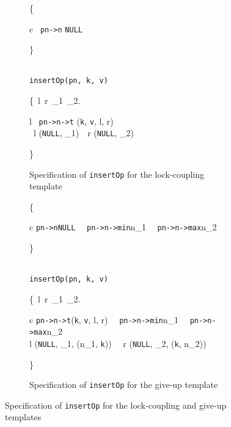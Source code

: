 \documentclass[sigplan,10pt,anonymous,review]{acmart}\settopmatter{printfolios=true,printccs=false,printacmref=false}
\begin{document}
\begin{figure*}[h]
	\begin{subfigure}{\textwidth}
		\centering
		\begin{mathpar}
			{\color{blue}
				\left\{ 
				\begin{array}{c}
					\ \texttt{pn->n} \mapsto \texttt{NULL}  
				\end{array}
				\right\}
			}
			\\ 
			\texttt{insertOp(pn, k, v)} 
			\\
			{\color{blue}
				\left\{\exists \  l\ r\ \mathit{lk}_1\ _2.
				\begin{array}{l}
					\ \texttt{pn->n->t} \mapsto (\texttt{k}, \texttt{v}, l, r) \ \ast \ \\ 
					\ l \mapsto (\texttt{NULL}, _1)\  \ast \ r \mapsto (\texttt{NULL}, \mathit{lk}_2)
				\end{array}
				\right\}
			}
		\end{mathpar}
		\caption{Specification of \texttt{insertOp} for the lock-coupling template}
		\label{fig:insertOp_lock}
	\end{subfigure}
	\begin{subfigure}{\textwidth}
		\begin{mathpar}
			{\color{blue}
				\left\{ 
				\begin{array}{c}
					\texttt{pn->n}\mapsto \texttt{NULL} \  \ast \ \texttt{pn->n->min}\mapsto n_1 \ \ast \ \texttt{pn->n->max}\mapsto n_2
				\end{array}
				\right\}
			}
			\\
			\texttt{insertOp(pn, k, v)}
			\\
			{\color{blue}
				\left\{\exists \ l\ r\ _1\ _2. 
				\begin{array}{c}
					\texttt{pn->n->t}\mapsto (\texttt{k}, \texttt{v}, l, r) \  \ast \ \texttt{pn->n->min}\mapsto n_1 \ \ast \ \texttt{pn->n->max}\mapsto n_2  \ \ast \ 
					\\ l \mapsto (\texttt{NULL}, _1, (n_1, \texttt{k})) \ \ast \ r \mapsto (\texttt{NULL}, \mathit{lk}_2, (\texttt{k}, n_2))
				\end{array}
				\right\}
			}
		\end{mathpar}
		\caption{Specification of \texttt{insertOp} for the give-up template}
		\label{fig:insertOp_giveup}
	\end{subfigure}
	\caption{Specification of \texttt{insertOp} for the lock-coupling and give-up templates}
	\label{fig:insertOp}
\end{figure*}
\end{document}
